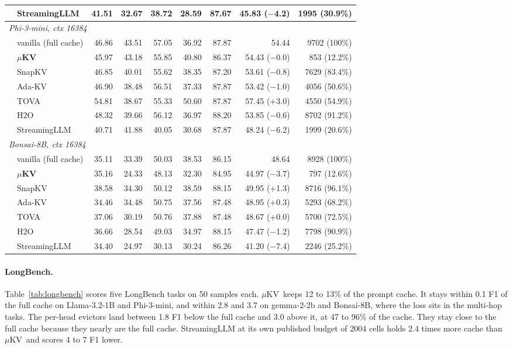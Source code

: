 \documentclass[sigconf, anonymous=false, screen=true]{acmart}
\newcommand{\muKV}{$\mu$KV}
\begin{document}
\begin{table}[tp]
\begin{tabular}{l l r r r r r r r}
  & StreamingLLM         & 41.51 & 32.67 & 38.72 & 28.59 & 87.67 & 45.83 ($-$4.2) & 1995 (30.9\%) \\
\midrule
\multicolumn{9}{l}{\emph{Phi-3-mini, ctx 16384}} \\
  & vanilla (full cache) & 46.86 & 43.51 & 57.05 & 36.92 & 87.87 & 54.44 & 9702 (100\%) \\
  & \textbf{\muKV}       & 45.97 & 43.18 & 55.85 & 40.80 & 86.37 & 54.43 ($-$0.0) & 853 (12.2\%) \\
  & SnapKV               & 46.85 & 40.01 & 55.62 & 38.35 & 87.20 & 53.61 ($-$0.8) & 7629 (83.4\%) \\
  & Ada-KV               & 46.90 & 38.48 & 56.51 & 37.33 & 87.87 & 53.42 ($-$1.0) & 4056 (50.6\%) \\
  & TOVA                 & 54.81 & 38.67 & 55.33 & 50.60 & 87.87 & 57.45 (+3.0) & 4550 (54.9\%) \\
  & H2O                  & 48.32 & 39.66 & 56.12 & 36.97 & 88.20 & 53.85 ($-$0.6) & 8702 (91.2\%) \\
  & StreamingLLM         & 40.71 & 41.88 & 40.05 & 30.68 & 87.87 & 48.24 ($-$6.2) & 1999 (20.6\%) \\
\midrule
\multicolumn{9}{l}{\emph{Bonsai-8B, ctx 16384}} \\
  & vanilla (full cache) & 35.11 & 33.39 & 50.03 & 38.53 & 86.15 & 48.64 & 8928 (100\%) \\
  & \textbf{\muKV}       & 35.16 & 24.33 & 48.13 & 32.30 & 84.95 & 44.97 ($-$3.7) & 797 (12.6\%) \\
  & SnapKV               & 38.58 & 34.30 & 50.12 & 38.59 & 88.15 & 49.95 (+1.3) & 8716 (96.1\%) \\
  & Ada-KV               & 34.46 & 34.48 & 50.75 & 37.56 & 87.48 & 48.95 (+0.3) & 5293 (68.2\%) \\
  & TOVA                 & 37.06 & 30.19 & 50.76 & 37.88 & 87.48 & 48.67 (+0.0) & 5700 (72.5\%) \\
  & H2O                  & 36.66 & 28.54 & 49.03 & 34.97 & 88.15 & 47.47 ($-$1.2) & 7798 (90.9\%) \\
  & StreamingLLM         & 34.40 & 24.97 & 30.13 & 30.24 & 86.26 & 41.20 ($-$7.4) & 2246 (25.2\%) \\
\bottomrule
\end{tabular}
\end{table}

\paragraph{LongBench.} Table~\ref{tab:longbench} scores five LongBench tasks on 50 samples each. \muKV\ keeps 12 to 13\% of the prompt cache. It stays within 0.1 F1 of the full cache on Llama-3.2-1B and Phi-3-mini, and within 2.8 and 3.7 on gemma-2-2b and Bonsai-8B, where the loss sits in the multi-hop tasks. The per-head evictors land between 1.8 F1 below the full cache and 3.0 above it, at 47 to 96\% of the cache. They stay close to the full cache because they nearly are the full cache. StreamingLLM at its own published budget of 2004 cells holds 2.4 times more cache than \muKV\ and scores 4 to 7 F1 lower.
\end{document}
